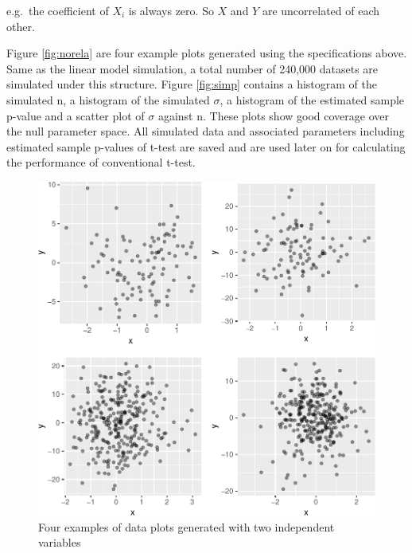 \documentclass[12pt]{article}
\begin{document}
e.g.~the coefficient of \(X_i\) is always zero. So \(X\) and \(Y\) are
uncorrelated of each other.

Figure \ref{fig:norela} are four example plots generated using the
specifications above. Same as the linear model simulation, a total
number of 240,000 datasets are simulated under this structure. Figure
\ref{fig:simp} contains a histogram of the simulated n, a histogram of
the simulated \(\sigma\), a histogram of the estimated sample p-value
and a scatter plot of \(\sigma\) against n. These plots show good
coverage over the null parameter space. All simulated data and
associated parameters including estimated sample p-values of t-test are
saved and are used later on for calculating the performance of
conventional t-test.

\begin{figure}
\centering
\includegraphics{pc_plots_files/figure-latex/norela-1.pdf}
\caption{Four examples of data plots generated with two independent
variables}
\end{figure}
\end{document}
